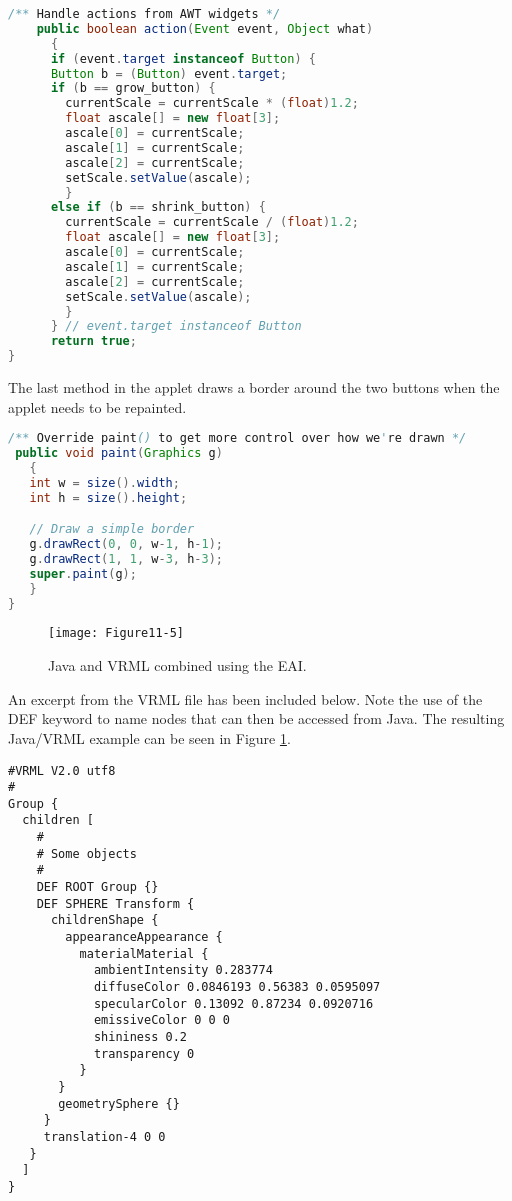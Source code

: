 \begin{lstlisting}[language=Java, caption={}, numbers=none, frame=none]
/** Handle actions from AWT widgets */
    public boolean action(Event event, Object what)
      {
      if (event.target instanceof Button) {
      Button b = (Button) event.target;
      if (b == grow_button) {
        currentScale = currentScale * (float)1.2;
        float ascale[] = new float[3];
        ascale[0] = currentScale;
        ascale[1] = currentScale;
        ascale[2] = currentScale;
        setScale.setValue(ascale);
        }
      else if (b == shrink_button) {
        currentScale = currentScale / (float)1.2;
        float ascale[] = new float[3];
        ascale[0] = currentScale;
        ascale[1] = currentScale;
        ascale[2] = currentScale;
        setScale.setValue(ascale);
        }
      } // event.target instanceof Button
      return true;
}
\end{lstlisting}

The last method in the applet draws a border around the two buttons when the applet needs to be repainted.

\begin{lstlisting}[language=Java, caption={}, numbers=none, frame=none]
/** Override paint() to get more control over how we're drawn */
 public void paint(Graphics g)
   {
   int w = size().width;
   int h = size().height;

   // Draw a simple border
   g.drawRect(0, 0, w-1, h-1);
   g.drawRect(1, 1, w-3, h-3);
   super.paint(g);
   }
}
\end{lstlisting}

\begin{figure}[!htb]
  \centering
  \texttt{[image: Figure11-5]}\\
  \caption{ Java and VRML combined using the EAI.}\label{fig:Figure11-5}
\end{figure}

An excerpt from the VRML file has been included below. Note the use of the DEF keyword to name nodes that can then be accessed from Java. The resulting Java/VRML example can be seen in Figure \ref{fig:Figure11-5}.

\begin{lstlisting}[language=VRML, caption={}, numbers=none, frame=none]
#VRML V2.0 utf8
#
Group {
  children [ 
    #
    # Some objects
    #
    DEF ROOT Group {}
    DEF SPHERE Transform {
      childrenShape {
        appearanceAppearance {
          materialMaterial {
            ambientIntensity 0.283774
            diffuseColor 0.0846193 0.56383 0.0595097
            specularColor 0.13092 0.87234 0.0920716
            emissiveColor 0 0 0
            shininess 0.2
            transparency 0
          }
       }
       geometrySphere {}
     }
     translation-4 0 0
   }
  ]
}
\end{lstlisting}

